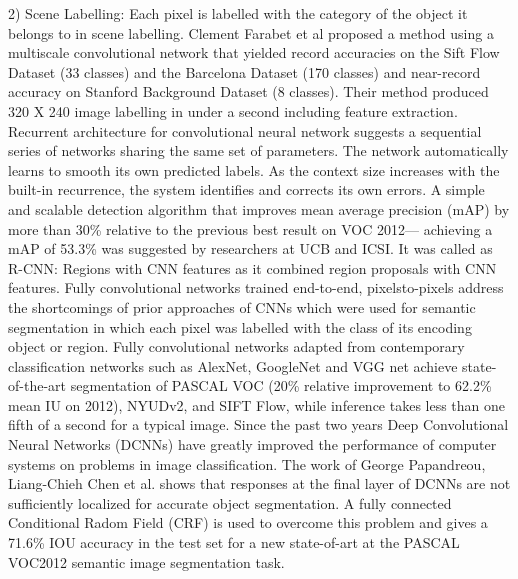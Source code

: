 \documentclass[12pt]{article}
\begin{document}
2) Scene Labelling: Each pixel is labelled with the
category of the object it belongs to in scene labelling.
Clement Farabet et al proposed a method using a multiscale
convolutional network that yielded record accuracies on the
Sift Flow Dataset (33 classes) and the Barcelona Dataset
(170 classes) and near-record accuracy on Stanford
Background Dataset (8 classes). Their method produced
320 X 240 image labelling in under a second including
feature extraction. 
Recurrent architecture  for convolutional neural
network suggests a sequential series of networks sharing the
same set of parameters. The network automatically learns to
smooth its own predicted labels. As the context size
increases with the built-in recurrence, the system identifies
and corrects its own errors. A simple and scalable detection
algorithm that improves mean average precision (mAP) by
more than 30\%
relative to the previous best result on VOC 2012—
achieving a mAP of 53.3\% was suggested by researchers at
UCB and ICSI. It was called as R-CNN: Regions with CNN
features as it combined region proposals with CNN features.
Fully convolutional networks trained end-to-end, pixelsto-pixels address the shortcomings of prior approaches of
CNNs which were used for semantic segmentation in which
each pixel was labelled with the class of its encoding object
or region. Fully convolutional networks adapted from
contemporary classification networks such as AlexNet,
GoogleNet and VGG net achieve state-of-the-art
segmentation of PASCAL VOC (20\% relative improvement
to 62.2\% mean IU on 2012), NYUDv2, and SIFT Flow,
while inference takes less than one fifth of a second for a
typical image.
Since the past two years Deep Convolutional Neural
Networks (DCNNs) have greatly improved the performance
of computer systems on problems in image classification. The work of George Papandreou, Liang-Chieh Chen
et al. shows that responses at the final layer of DCNNs are
not sufficiently localized for accurate object segmentation.
A fully connected Conditional Radom Field (CRF) is used
to overcome this problem and gives a 71.6\% IOU accuracy
in the test set for a new state-of-art at the PASCAL VOC2012 semantic image segmentation task.
\end{document}
